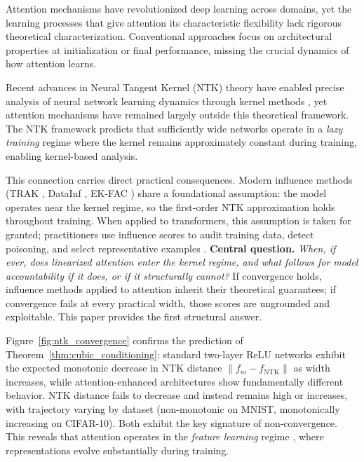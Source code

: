 \documentclass{article}
\theoremstyle{plain}
\theoremstyle{definition}
\theoremstyle{remark}
\begin{document}
Attention mechanisms have revolutionized deep learning across domains, yet the learning processes that give attention its characteristic flexibility lack rigorous theoretical characterization. Conventional approaches focus on architectural properties at initialization or final performance, missing the crucial dynamics of how attention learns.

Recent advances in Neural Tangent Kernel (NTK) theory have enabled precise analysis of neural network learning dynamics through kernel methods \citep{jacot2018neural, lee2019wide}, yet attention mechanisms have remained largely outside this theoretical framework. The NTK framework predicts that sufficiently wide networks operate in a \emph{lazy training} regime where the kernel remains approximately constant during training, enabling kernel-based analysis.

This connection carries direct practical consequences. Modern influence methods (TRAK \citep{park2023trak}, DataInf \citep{kwon2023datainf}, EK-FAC \citep{grosse2023ekfac}) share a foundational assumption: the model operates near the kernel regime, so the first-order NTK approximation holds throughout training. When applied to transformers, this assumption is taken for granted; practitioners use influence scores to audit training data, detect poisoning, and select representative examples \citep{koh2017understanding, zhang2022rethinking}. \textbf{Central question.} \emph{When, if ever, does linearized attention enter the kernel regime, and what follows for model accountability if it does, or if it structurally cannot?} If convergence holds, influence methods applied to attention inherit their theoretical guarantees; if convergence fails at every practical width, those scores are ungrounded and exploitable. This paper provides the first structural answer.

Figure~\ref{fig:ntk_convergence} confirms the prediction of Theorem~\ref{thm:cubic_conditioning}: standard two-layer ReLU networks exhibit the expected monotonic decrease in NTK distance $\|f_m - f_{\text{NTK}}\|$ as width increases, while attention-enhanced architectures show fundamentally different behavior. NTK distance fails to decrease and instead remains high or increases, with trajectory varying by dataset (non-monotonic on MNIST, monotonically increasing on CIFAR-10). Both exhibit the key signature of non-convergence. This reveals that attention operates in the \emph{feature learning} regime \citep{chizat2019lazy}, where representations evolve substantially during training.
\end{document}
